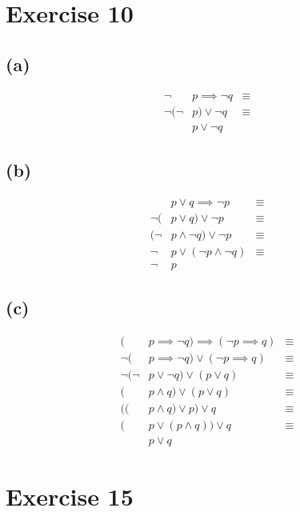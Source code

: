 \documentclass{article}
\begin{document}
\pagebreak

\section{Exercise 10}

\subsection{(a)}
\begin{align*}
	\neg       & p \implies \neg q & \equiv \\
	\neg (\neg & p) \lor \neg q    & \equiv \\
	           & p \lor \neg q
\end{align*}

\subsection{(b)}
\begin{align*}
	       & p \lor q \implies \neg p     & \equiv \\
	\neg ( & p \lor q) \lor \neg p        & \equiv \\
	(\neg  & p \land \neg q) \lor \neg p  & \equiv \\
	\neg   & p \lor (\neg p \land \neg q) & \equiv \\
	\neg   & p
\end{align*}

\subsection{(c)}
\begin{align*}
	(          & p \implies \neg q) \implies (\neg p \implies q) & \equiv \\
	\neg (     & p \implies \neg q) \lor (\neg p \implies q)     & \equiv \\
	\neg (\neg & p \lor \neg q) \lor (p \lor q)                  & \equiv \\
	(          & p \land q) \lor (p \lor q)                      & \equiv \\
	((         & p \land q) \lor p) \lor q                       & \equiv \\
	(          & p \lor (p \land q)) \lor q                      & \equiv \\
	           & p \lor q
\end{align*}

\pagebreak

\section{Exercise 15}
\end{document}
